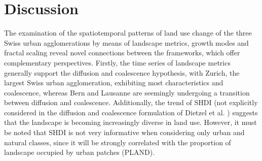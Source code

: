 \documentclass[10pt,letterpaper]{article}
\begin{document}

\section*{Discussion}

The examination of the spatiotemporal patterns of land use change of the three Swiss urban agglomerations by means of landscape metrics, growth modes and fractal scaling reveal novel connections between the frameworks, which offer complementary perspectives.
Firstly, the time series of landscape metrics generally support the diffusion and coalescence hypothesis, with Zurich, the largest Swiss urban agglomeration, exhibiting most characteristics and coalescence, whereas Bern and Lausanne are seemingly undergoing a transition between diffusion and coalescence. Additionally, the trend of SHDI (not explicitly considered in the diffusion and coalescence formulation of Dietzel et al. \cite{dietzel2005spatio}) suggests that the landscape is becoming increasingly diverse in land use. %
However, it must be noted that SHDI is not very informative when considering only urban and natural classes, since it will be strongly correlated with the proportion of landscape occupied by urban patches (PLAND).
\end{document}
